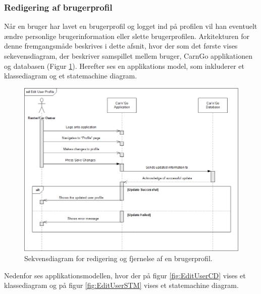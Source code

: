\documentclass[Arkitektur/System_main.tex]{subfiles}
\begin{document}
\subsubsection{Redigering af brugerprofil}
Når en bruger har lavet en brugerprofil og logget ind på profilen vil han eventuelt ændre personlige brugerinformation eller slette brugerprofilen. Arkitekturen for denne fremgangsmåde beskrives i dette afsnit, hvor der som det første vises sekevensdiagram, der beskriver samspillet mellem bruger, CarnGo applikationen og databasen (Figur \ref{fig:EditUserSD}). Herefter ses en applikations model, som inkluderer et klassediagram og et statemachine diagram.
\begin{figure}[H]
    \centering
    \includegraphics[width=1\textwidth]{Arkitektur/Softwarearkitektur/Edit_user_profile/graphics/SystemSD_ProfilerSD.png}
    \caption{Sekvensdiagram for redigering og fjernelse af en brugerprofil. }
    \label{fig:EditUserSD}
\end{figure}
Nedenfor ses applikationsmodellen, hvor der på figur \ref{fig:EditUserCD} vises et klassediagram og på figur \ref{fig:EditUserSTM} vises et statemachine diagram.
\end{document}
